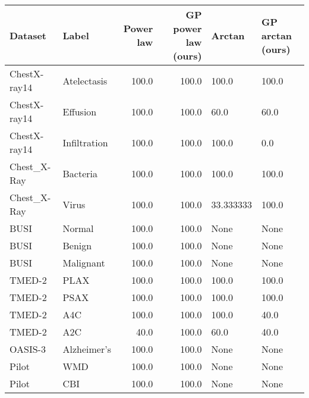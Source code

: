 \begin{tabular}{llrrll}
\toprule
     Dataset &        Label &  Power law &  GP power law (ours) &     Arctan & GP arctan (ours) \\
\midrule
ChestX-ray14 &  Atelectasis &      100.0 &                100.0 &      100.0 &            100.0 \\
ChestX-ray14 &     Effusion &      100.0 &                100.0 &       60.0 &             60.0 \\
ChestX-ray14 & Infiltration &      100.0 &                100.0 &      100.0 &              0.0 \\
 Chest\_X-Ray &     Bacteria &      100.0 &                100.0 &      100.0 &            100.0 \\
 Chest\_X-Ray &        Virus &      100.0 &                100.0 &  33.333333 &            100.0 \\
        BUSI &       Normal &      100.0 &                100.0 &       None &             None \\
        BUSI &       Benign &      100.0 &                100.0 &       None &             None \\
        BUSI &    Malignant &      100.0 &                100.0 &       None &             None \\
      TMED-2 &         PLAX &      100.0 &                100.0 &      100.0 &            100.0 \\
      TMED-2 &         PSAX &      100.0 &                100.0 &      100.0 &            100.0 \\
      TMED-2 &          A4C &      100.0 &                100.0 &      100.0 &             40.0 \\
      TMED-2 &          A2C &       40.0 &                100.0 &       60.0 &             40.0 \\
     OASIS-3 &  Alzheimer’s &      100.0 &                100.0 &       None &             None \\
       Pilot &          WMD &      100.0 &                100.0 &       None &             None \\
       Pilot &          CBI &      100.0 &                100.0 &       None &             None \\
\bottomrule
\end{tabular}
